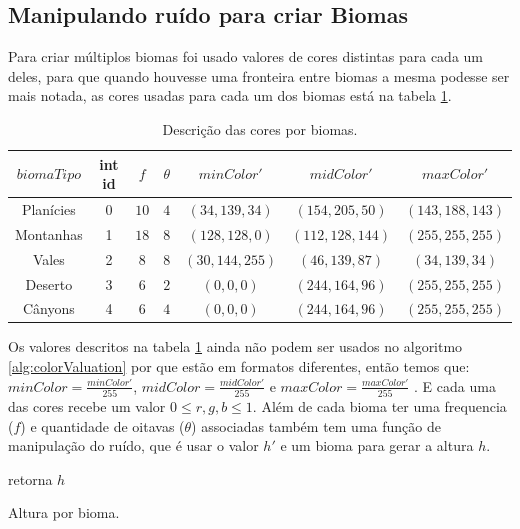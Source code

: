 \subsection{Manipulando ruído para criar Biomas}
Para criar múltiplos biomas foi usado valores de cores distintas para cada um deles, 
para que quando houvesse uma fronteira entre biomas a mesma podesse ser mais notada, as
cores usadas para cada um dos biomas está na tabela \ref{tab:bioColors}.
\begin{table}[H]
    \centering
    \caption{Descrição das cores por biomas.}
    \label{tab:bioColors}
    \begin{tabular}{| c | c c c c c c|}
        \hline
        $biomaTipo$ & int id & $f$ & $\theta$ & $minColor'$ & $midColor'$ & $maxColor'$\\
        \hline
        Planícies   & 0 & $10$ & $4$ & $(34, 139, 34) $ & $(154, 205, 50) $ & $(143,188,143)  $  \\
        Montanhas & 1 & $18$ & $8$ & $(128, 128, 0) $ & $(112, 128, 144)$ & $(255, 255, 255)$  \\
        Vales   & 2 & $8$  & $8$ & $(30, 144, 255)$ & $(46, 139, 87)  $ & $(34, 139, 34)  $  \\
        Deserto   & 3 & $6$  & $2$ & $(0, 0, 0)     $ & $(244, 164, 96) $ & $(255, 255, 255)$  \\
        Cânyons  & 4 & $6$  & $4$ & $(0, 0, 0)     $ & $(244, 164, 96) $ & $(255, 255, 255)$  \\
        \hline
    \end{tabular}
\end{table}

Os valores descritos na tabela \ref{tab:bioColors} ainda não podem ser usados no
algoritmo \ref{alg:colorValuation} por que estão em formatos diferentes, então temos
que: $minColor = \frac{minColor'}{255}$, $midColor = \frac{midColor'}{255}$ e $maxColor = \frac{maxColor'}{255}$ . E cada uma das cores recebe um valor
$0 \leq r, g, b \leq 1$.
Além de cada bioma ter uma frequencia ($f$) e quantidade de oitavas ($\theta$) associadas
também tem uma função de manipulação do ruído, que é usar o valor $h'$ e um bioma
para gerar a altura $h$.

\begin{algorithm}[H]\label{alg:hBioValuation}
    retorna $h$\;
    \caption{Altura por bioma.}
\end{algorithm}

